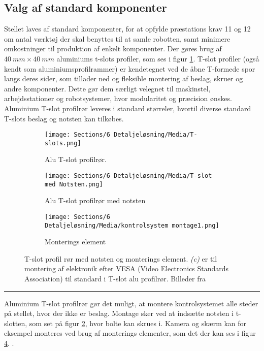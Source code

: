 \subsection{Valg af standard komponenter} \label{Standard komponenter}
Stellet laves af standard komponenter, for at opfylde præstations krav 11 og 12 om antal værktøj der skal benyttes til at samle robotten, samt minimere omkostninger til produktion af enkelt komponenter. Der gøres brug af $\SI{40}{mm}\times\SI{40}{mm}$ aluminiums t-slots profiler, som ses i figur \ref{fig:T-slot profil 1}. T-slot profiler (også kendt som aluminiumsprofilrammer) er kendetegnet ved de åbne T-formede spor langs deres sider, som tillader ned og fleksible montering af beslag, skruer og andre komponenter. Dette gør dem særligt velegnet til maskinstel, arbejdsstationer og robotsystemer, hvor modularitet og præcision ønskes. Aluminium T-slot profilrør leveres i standard størreler, hvortil diverse standard T-slots beslag og notsten kan tilkøbes. \parencite{McMaster-Carr2025T-slottedFraming}

\begin{figure}[H]
    \centering
    \begin{subfigure}[b]{0.34\textwidth}
        \texttt{[image: Sections/6 Detaljeløsning/Media/T-slots.png]}
        \caption{Alu T-slot profilrør.} 
        \label{fig:T-slot profil 1}
    \end{subfigure}
    \hfill
    \begin{subfigure}[b]{0.4\textwidth}
       \centering
        \texttt{[image: Sections/6 Detaljeløsning/Media/T-slot med Notsten.png]}
        \caption{Alu T-slot profilrør med notsten} 
        \label{fig: T-slot profil med notsten}
    \end{subfigure}
     \hfill
    \begin{subfigure}[b]{0.24\textwidth}
        \centering
        \texttt{[image: Sections/6 Detaljeløsning/Media/kontrolsystem montage1.png]}
         \caption{Monterings element}
    \label{fig:T-slot tablet holder}
    \end{subfigure}
    \caption{T-slot profil rør med notsten og monterings element. \textit{(c)} er til montering af elektronik efter VESA (Video Electronics Standards Association) til standard i T-slot alu profilrør. Billeder fra \parencite{McMaster-Carr2025T-SlottedRails}}
\end{figure} \plainbreak{-1}

Aluminium T-slot profilrør gør det muligt, at montere kontrolsystemet alle steder på stellet, hvor der ikke er beslag. Montage sker ved at indsætte notsten i t-slotten, som set på figur \ref{fig: T-slot profil med notsten}, hvor bolte kan skrues i. Kamera og skærm kan for eksempel monteres ved brug af monterings elementer, som det der kan ses i figur \ref{fig:T-slot tablet holder}. \parencite{McMaster-Carr2025T-slottedFraming}.





